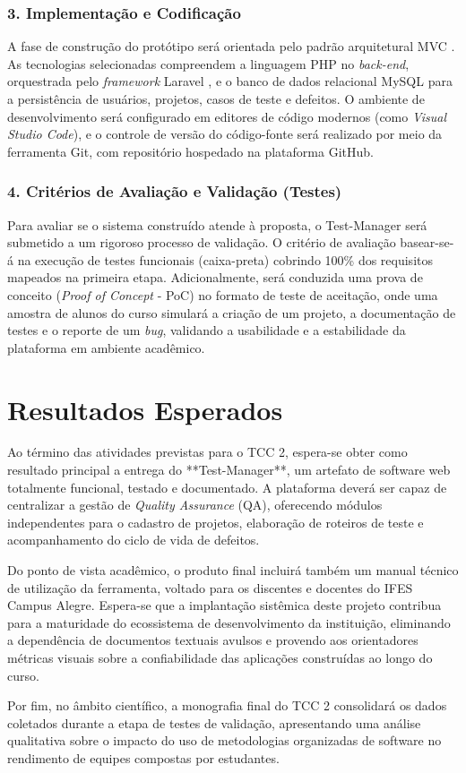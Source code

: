 \subsection{3. Implementação e Codificação}
A fase de construção do protótipo será orientada pelo padrão arquitetural MVC \cite{barrosMVC}. As tecnologias selecionadas compreendem a linguagem PHP no \textit{back-end}, orquestrada pelo \textit{framework} Laravel \cite{laravel2026}, e o banco de dados relacional MySQL para a persistência de usuários, projetos, casos de teste e defeitos. O ambiente de desenvolvimento será configurado em editores de código modernos (como \textit{Visual Studio Code}), e o controle de versão do código-fonte será realizado por meio da ferramenta Git, com repositório hospedado na plataforma GitHub.

\subsection{4. Critérios de Avaliação e Validação (Testes)}
Para avaliar se o sistema construído atende à proposta, o Test-Manager será submetido a um rigoroso processo de validação. O critério de avaliação basear-se-á na execução de testes funcionais (caixa-preta) cobrindo 100\% dos requisitos mapeados na primeira etapa. Adicionalmente, será conduzida uma prova de conceito (\textit{Proof of Concept} - PoC) no formato de teste de aceitação, onde uma amostra de alunos do curso simulará a criação de um projeto, a documentação de testes e o reporte de um \textit{bug}, validando a usabilidade e a estabilidade da plataforma em ambiente acadêmico.

\chapter{Resultados Esperados}

Ao término das atividades previstas para o TCC 2, espera-se obter como resultado principal a entrega do **Test-Manager**, um artefato de software web totalmente funcional, testado e documentado. A plataforma deverá ser capaz de centralizar a gestão de \textit{Quality Assurance} (QA), oferecendo módulos independentes para o cadastro de projetos, elaboração de roteiros de teste e acompanhamento do ciclo de vida de defeitos.

Do ponto de vista acadêmico, o produto final incluirá também um manual técnico de utilização da ferramenta, voltado para os discentes e docentes do IFES Campus Alegre. Espera-se que a implantação sistêmica deste projeto contribua para a maturidade do ecossistema de desenvolvimento da instituição, eliminando a dependência de documentos textuais avulsos e provendo aos orientadores métricas visuais sobre a confiabilidade das aplicações construídas ao longo do curso.

Por fim, no âmbito científico, a monografia final do TCC 2 consolidará os dados coletados durante a etapa de testes de validação, apresentando uma análise qualitativa sobre o impacto do uso de metodologias organizadas de software no rendimento de equipes compostas por estudantes.